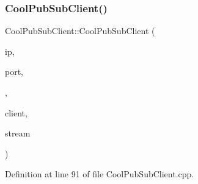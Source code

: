 \subsubsection{\texorpdfstring{Cool\+Pub\+Sub\+Client()}{CoolPubSubClient()}\hspace{0.1cm}{\footnotesize\ttfamily [10/14]}}
{\footnotesize\ttfamily Cool\+Pub\+Sub\+Client\+::\+Cool\+Pub\+Sub\+Client (\begin{DoxyParamCaption}\item[{uint8\+\_\+t $\ast$}]{ip,  }\item[{uint16\+\_\+t}]{port,  }\item[{\hyperlink{class_cool_pub_sub_client_a021ec75e9fbaf658370b8005ccfddc14}{M\+Q\+T\+T\+\_\+\+C\+A\+L\+L\+B\+A\+C\+K\+\_\+\+S\+I\+G\+N\+A\+T\+U\+RE}}]{,  }\item[{Client \&}]{client,  }\item[{Stream \&}]{stream }\end{DoxyParamCaption})}



Definition at line 91 of file Cool\+Pub\+Sub\+Client.\+cpp.


